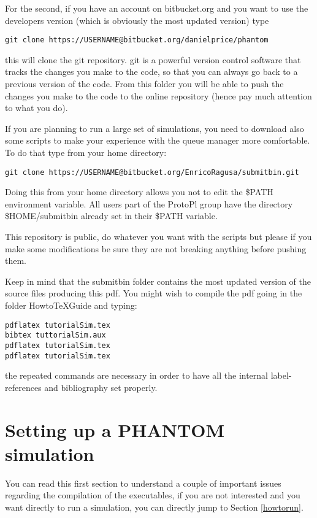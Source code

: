 \documentclass[10pt,a4paper,twoside]{article} %
\begin{document}
For the second, if you have an account on bitbucket.org and you want to use the developers version (which is obviously the most updated version) type
\begin{verbatim}
git clone https://USERNAME@bitbucket.org/danielprice/phantom
\end{verbatim}
this will clone the git repository. git is a powerful version control software that tracks the changes you make to the code, so that you can always go back to a previous version of the code. From this folder you will be able to push the changes you make to the code to the online repository (hence pay much attention to what you do).

If you are planning to run a large set of simulations, you need to download also some scripts to make your experience with the queue manager more comfortable. To do that type from your home directory:
\begin{verbatim}
git clone https://USERNAME@bitbucket.org/EnricoRagusa/submitbin.git
\end{verbatim}
Doing this from your home directory allows you not to edit the \$PATH environment variable. All users part of the ProtoPl group have the directory \$HOME/submitbin already set in their \$PATH variable.

This repository is public, do whatever you want with the scripts but please if you make some modifications be sure they are not breaking anything before pushing them.

Keep in mind that the submitbin folder contains the most updated version of the source files producing this pdf. You might wish to compile the pdf going in the folder HowtoTeXGuide and typing:
\begin{verbatim}
pdflatex tutorialSim.tex
bibtex tuttorialSim.aux
pdflatex tutorialSim.tex
pdflatex tutorialSim.tex
\end{verbatim}
the repeated commands are necessary in order to have all the internal label-references and bibliography set properly.


\section{Setting up a PHANTOM simulation}

You can read this first section to understand a couple of important issues regarding the compilation of the executables, if you are not interested and you want directly to run a simulation, you can directly jump to Section \ref{howtorun}.
\end{document}
